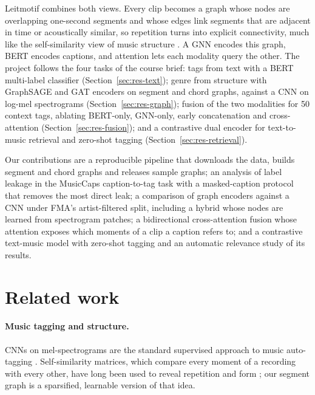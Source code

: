 \documentclass{article}
\begin{document}
Leitmotif combines both views. Every clip becomes a graph whose nodes are overlapping one-second segments and whose
edges link segments that are adjacent in time or acoustically similar, so repetition turns into explicit connectivity,
much like the self-similarity view of music structure \citep{foote1999selfsimilarity}. A GNN
\citep{hamilton2017graphsage, velickovic2018gat} encodes this graph, BERT \citep{devlin2019bert} encodes captions, and
attention \citep{vaswani2017attention} lets each modality query the other. The project follows the four tasks of the
course brief: tags from text with a BERT multi-label classifier (Section~\ref{sec:res-text}); genre from structure with
GraphSAGE and GAT encoders on segment and chord graphs, against a CNN on log-mel spectrograms
(Section~\ref{sec:res-graph}); fusion of the two modalities for 50 context tags, ablating BERT-only, GNN-only, early
concatenation and cross-attention (Section~\ref{sec:res-fusion}); and a contrastive dual encoder for text-to-music
retrieval and zero-shot tagging (Section~\ref{sec:res-retrieval}).

Our contributions are a reproducible pipeline that downloads the data, builds segment and chord graphs and releases
sample graphs; an analysis of label leakage in the MusicCaps caption-to-tag task with a masked-caption protocol that
removes the most direct leak; a comparison of graph encoders against a CNN under FMA's artist-filtered split,
including a hybrid whose nodes are learned from spectrogram patches; a bidirectional cross-attention fusion whose
attention exposes which moments of a clip a caption refers to; and a contrastive text-music model with zero-shot
tagging and an automatic relevance study of its results.

\section{Related work}

\paragraph{Music tagging and structure.}
CNNs on mel-spectrograms are the standard supervised approach to music auto-tagging \citep{choi2016tagging}.
Self-similarity matrices, which compare every moment of a recording with every other, have long been used to reveal
repetition and form \citep{foote1999selfsimilarity}; our segment graph is a sparsified, learnable version of that idea.
\end{document}

